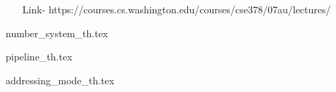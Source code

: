 
\begin{enumerate}
    \item[Link-] https://courses.cs.washington.edu/courses/cse378/07au/lectures/
\end{enumerate}

{number_system_th.tex}      \newpage

{pipeline_th.tex}            \newpage

{addressing_mode_th.tex}            \newpage
